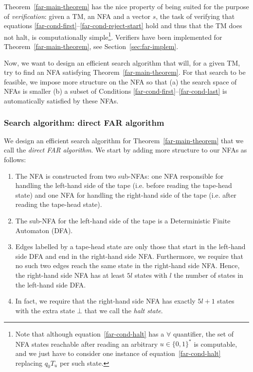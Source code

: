 \begin{remark}[Verification]\label{far-remark-verification}
    Theorem~\ref{far-main-theorem} has the nice property of being suited for the purpose of \textit{verification}: given a TM, an NFA and a vector $s$, the task of verifying that equations \eqref{far-cond-first}--\eqref{far-cond-reject-start} hold and thus that the TM does not halt, is computationally simple\footnote{Note that although equation~\eqref{far-cond-halt} has a $\forall$ quantifier, the set of NFA states reachable after reading an arbitrary $u \in \{0,1\}^*$ is computable, and we just have to consider one instance of equation~\eqref{far-cond-halt} replacing $q_0 T_u$ per such state.}. Verifiers have been implemented for Theorem~\ref{far-main-theorem}, see Section~\ref{sec:far-implem}.
\end{remark}


Now, we want to design an efficient search algorithm that will, for a given TM, try to find an NFA satisfying Theorem~\ref{far-main-theorem}. For that search to be feasible, we impose more structure on the NFA so that (a) the search space of NFAs is smaller (b) a subset of Conditions \eqref{far-cond-first}--\eqref{far-cond-last} is automatically satisfied by these NFAs.


\subsubsection{Search algorithm: direct FAR algorithm}
\label{far-algo-direct}

We design an efficient search algorithm for Theorem~\ref{far-main-theorem} that we call the \textit{direct FAR algorithm}. We start by adding more structure to our NFAs as follows:


\begin{enumerate}

    \item The NFA is constructed from two sub-NFAs: one NFA responsible for handling the left-hand side of the tape (i.e. before reading the tape-head state) and one NFA for handling the right-hand side of the tape (i.e. after reading the tape-head state).
    \item The sub-NFA for the left-hand side of the tape is a Deterministic Finite Automaton (DFA).
    \item Edges labelled by a tape-head state are only those that start in the left-hand side DFA and end in the right-hand side NFA. Furthermore, we require that no such two edges reach the same state in the right-hand side NFA. Hence, the right-hand side NFA has at least $5l$ states with $l$ the number of states in the left-hand side DFA.\label{pt:injective}
    \item In fact, we require that the right-hand side NFA has exactly $5l+1$ states with the extra state $\bot$ that we call the \textit{halt state}.

\end{enumerate}

